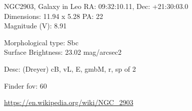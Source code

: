 \begin{block}{NGC2903, Galaxy in Leo}
    RA: 09:32:10.11, Dec: +21:30:03.0 \\ 
    Dimensions: 11.94 x 5.28 PA: 22 \\ 
    Magnitude (V): 8.91

    Morphological type: Sbc \\ 
    Surface Brightness: 23.02 mag/arcsec2 

    Desc: (Dreyer) cB, vL, E, gmbM, r, sp of 2 

    Finder fov: 60 

    \url{https://en.wikipedia.org/wiki/NGC_2903} 
\end{block}